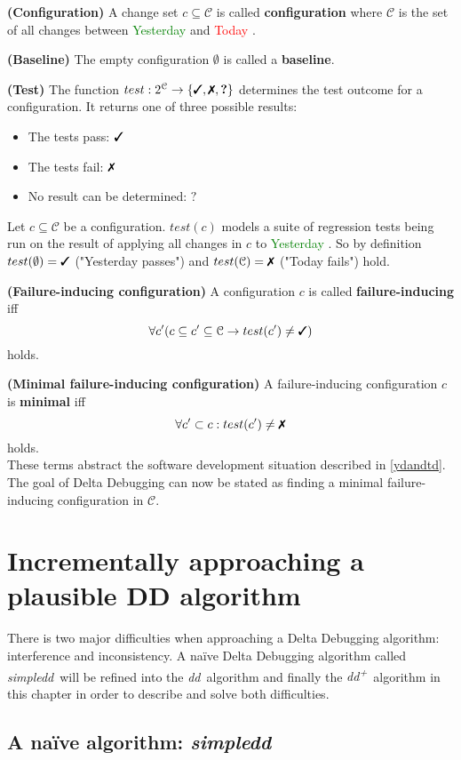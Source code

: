 \documentclass[a4paper,UKenglish]{lipics-v2018}
\newcommand{\sdd}[0]{\textit{simpledd}}
\newcommand{\dd}[0]{\textit{dd}}
\newcommand{\ddp}{\textit{dd\textsuperscript{+}}}
\newcommand{\green}[1]{\textcolor{green}{#1}}
\newcommand{\red}[1]{\textcolor{red}{#1}}
\newcommand{\yd}[0]{\green{Yesterday} }
\newcommand{\td}[0]{\red{Today} }
\newcommand{\C}[0]{\ensuremath{\mathcal{C}}}
\newcommand{\cmark}{\text{\ding{51}}}
\newcommand{\xmark}{\text{\ding{55}}}
\newcommand{\qmark}{\textbf{?}}
\newcommand{\defsub}[1]{\textbf{(#1)} }
\newcommand{\set}[1]{\left \{ #1 \right \}}
\begin{document}
 \defsub{Configuration} A change set $c \subseteq \C$ is called \textbf{configuration} where $\C$ is the set of all changes between \yd and \td.

 \defsub{Baseline} The empty configuration $\emptyset$ is called a \textbf{baseline}.

 \defsub{Test} The function $test: 2^{\C} \to \set{\cmark, \xmark, \qmark}$ determines the test outcome for a configuration. It returns one of three possible results: 
\begin{itemize}
	\item The tests pass: $\cmark$
	\item The tests fail: $\xmark$
	\item No result can be determined: $\qmark$
\end{itemize} 

Let $c \subseteq \C$ be a configuration. $test(c)$ models a suite of regression tests being run on the result of applying all changes in $c$ to \yd. So by definition $test(\emptyset) = \cmark$ ("Yesterday passes") and $test(\C) = \xmark$ ("Today fails") hold.

 \defsub{Failure-inducing configuration} A configuration $c$ is called \textbf{failure-inducing} iff 
\[ \forall c' (c \subseteq c' \subseteq \C \rightarrow test(c') \ne \cmark) \] 
holds.

 \defsub{Minimal failure-inducing configuration} A failure-inducing configuration $c$ is \textbf{minimal} iff 
\[ \forall c' \subset c: test(c') \ne \xmark \]
holds.\\


These terms abstract the software development situation described in \ref{ydandtd}. The goal of Delta Debugging can now be stated as finding a minimal failure-inducing configuration in $\C$.

\section{Incrementally approaching a plausible DD algorithm}

There is two major difficulties when approaching a Delta Debugging algorithm: interference and inconsistency. A na\"ive Delta Debugging algorithm called \sdd\ will be refined into the \dd\ algorithm and finally the \ddp\ algorithm in this chapter in order to describe and solve both difficulties. 

\subsection{A na\"ive algorithm: \sdd}
\end{document}
